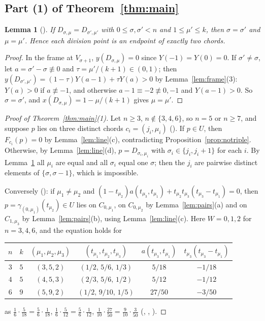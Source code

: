 \documentclass[11pt]{amsart}
\theoremstyle{plain}
\newtheorem{lemma}[theorem]{Lemma}
\theoremstyle{definition}
\begin{document}
\subsection{Part (1) of Theorem~\ref{thm:main}}

\begin{lemma}[]\label{lem:divpt}
If $D_{\sigma,\mu}=D_{\sigma',\mu'}$ with $0\le\sigma,\sigma'<n$ and $1\le\mu'\le k$, then $\sigma=\sigma'$ and $\mu=\mu'$. Hence each division point is an endpoint of exactly two chords.
\end{lemma}

\begin{proof}
In the frame at $V_{\sigma+1}$, $y(D_{\sigma,\mu})=0$ since $Y(-1)=Y(0)=0$. If $\sigma'\ne\sigma$, let $a=\sigma'-\sigma\not\equiv0$ and $\tau=\mu'/(k+1)\in(0,1)$; then $y(D_{\sigma',\mu'})=(1-\tau)Y(a-1)+\tau Y(a)>0$ by Lemma~\ref{lem:frame}(3): $Y(a)>0$ if $a\not\equiv-1$, and otherwise $a-1\equiv-2\not\equiv0,-1$ and $Y(a-1)>0$. So $\sigma=\sigma'$, and $x(D_{\sigma,\mu})=1-\mu/(k+1)$ gives $\mu=\mu'$.
\end{proof}

\begin{proof}[Proof of Theorem~\ref{thm:main}(1)]
Let $n\ge3$, $n\notin\{3,4,6\}$, so $n=5$ or $n\ge7$, and suppose $p$ lies on three distinct chords $c_i=(j_i,\mu_i)$ (). If $p\in U$, then $F_{c_i}(p)=0$ by Lemma~\ref{lem:line}(c), contradicting Proposition~\ref{prop:notriple}. Otherwise, by Lemma~\ref{lem:line}(d), $p=D_{\sigma_i,\mu_i}$ with $\sigma_i\in\{j_i,j_i+1\}$ for each $i$. By Lemma~\ref{lem:divpt} all $\mu_i$ are equal and all $\sigma_i$ equal one $\sigma$; then the $j_i$ are pairwise distinct elements of $\{\sigma,\sigma-1\}$, which is impossible.

Conversely (): if $\mu_1\ne\mu_2$ and $(1-t_{\mu_2})a(t_{\mu_3},t_{\mu_1})+t_{\mu_2}t_{\mu_3}(t_{\mu_3}-t_{\mu_1})=0$, then $p=\gamma_{(0,\mu_1)}(t_{\mu_2})\in U$ lies on $C_{0,\mu_1}$, on $C_{0,\mu_2}$ by Lemma~\ref{lem:pairs}(a) and on $C_{1,\mu_3}$ by Lemma~\ref{lem:pairs}(b), using Lemma~\ref{lem:line}(c). Here $W=0,1,2$ for $n=3,4,6$, and the equation holds for
\begin{center}
\begin{tabular}{cccccc}
$n$ & $k$ & $(\mu_1,\mu_2,\mu_3)$ & $(t_{\mu_1},t_{\mu_2},t_{\mu_3})$ & $a(t_{\mu_3},t_{\mu_1})$ & $t_{\mu_3}(t_{\mu_3}-t_{\mu_1})$\\\hline
$3$ & $5$ & $(3,5,2)$ & $(1/2,\,5/6,\,1/3)$ & $5/18$ & $-1/18$\\
$4$ & $5$ & $(4,5,3)$ & $(2/3,\,5/6,\,1/2)$ & $5/12$ & $-1/12$\\
$6$ & $9$ & $(5,9,2)$ & $(1/2,\,9/10,\,1/5)$ & $27/50$ & $-3/50$
\end{tabular}
\end{center}
as $\frac16\cdot\frac5{18}=\frac56\cdot\frac1{18}$, $\frac16\cdot\frac5{12}=\frac56\cdot\frac1{12}$, $\frac1{10}\cdot\frac{27}{50}=\frac9{10}\cdot\frac3{50}$ (, , ).
\end{proof}
\end{document}
